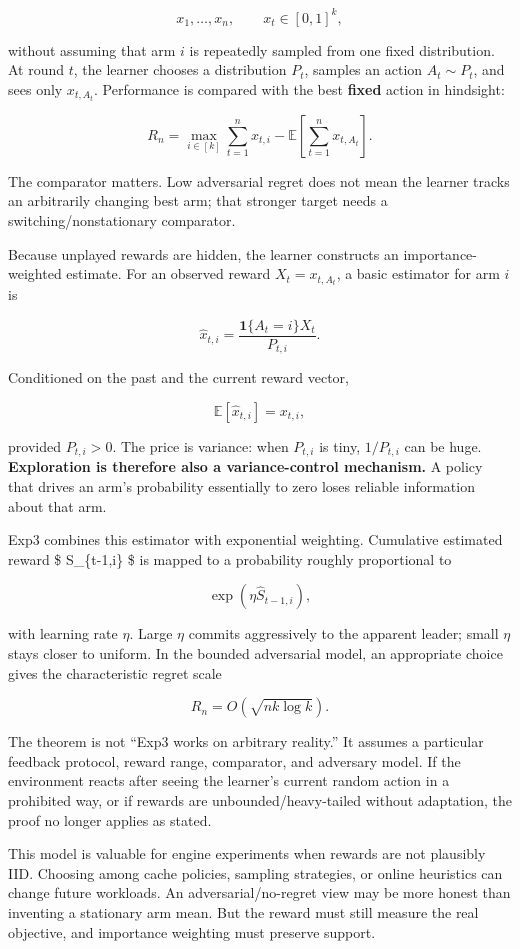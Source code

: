 \[
x_1,\ldots,x_n,\qquad x_t\in[0,1]^k,
\]

without assuming that arm \(i\) is repeatedly sampled from one fixed distribution. At round \(t\), the learner chooses a distribution \(P_t\), samples an action \(A_t\sim P_t\), and sees only \(x_{t,A_t}\). Performance is compared with the best \textbf{fixed} action in hindsight:

\[
R_n
=
\max_{i\in[k]}
\sum_{t=1}^{n}x_{t,i}
-
\mathbb E\!\left[
\sum_{t=1}^{n}x_{t,A_t}
\right].
\]

The comparator matters. Low adversarial regret does not mean the learner tracks an arbitrarily changing best arm; that stronger target needs a switching/nonstationary comparator.

Because unplayed rewards are hidden, the learner constructs an importance-weighted estimate. For an observed reward \(X_t=x_{t,A_t}\), a basic estimator for arm \(i\) is

\[
\hat x_{t,i}
=
\frac{\mathbf 1\{A_t=i\}X_t}{P_{t,i}}.
\]

Conditioned on the past and the current reward vector,

\[
\mathbb E[\hat x_{t,i}]
=
x_{t,i},
\]

provided \(P_{t,i}>0\). The price is variance: when \(P_{t,i}\) is tiny, \(1/P_{t,i}\) can be huge. \textbf{Exploration is therefore also a variance-control mechanism.} A policy that drives an arm's probability essentially to zero loses reliable information about that arm.

Exp3 combines this estimator with exponential weighting. Cumulative estimated reward \$ \hat S\_\{t-1,i\} \$ is mapped to a probability roughly proportional to

\[
\exp(\eta\hat S_{t-1,i}),
\]

with learning rate \(\eta\). Large \(\eta\) commits aggressively to the apparent leader; small \(\eta\) stays closer to uniform. In the bounded adversarial model, an appropriate choice gives the characteristic regret scale

\[
R_n=O(\sqrt{nk\log k}).
\]

The theorem is not ``Exp3 works on arbitrary reality.'' It assumes a particular feedback protocol, reward range, comparator, and adversary model. If the environment reacts after seeing the learner's current random action in a prohibited way, or if rewards are unbounded/heavy-tailed without adaptation, the proof no longer applies as stated.

This model is valuable for engine experiments when rewards are not plausibly IID. Choosing among cache policies, sampling strategies, or online heuristics can change future workloads. An adversarial/no-regret view may be more honest than inventing a stationary arm mean. But the reward must still measure the real objective, and importance weighting must preserve support.

